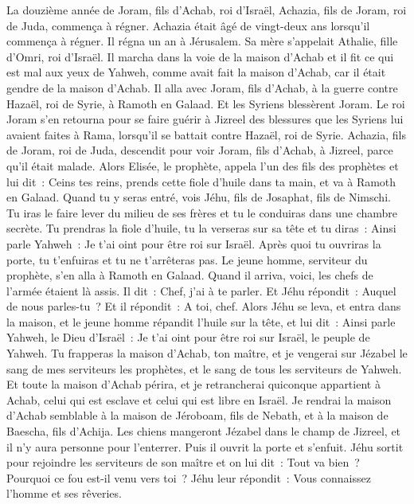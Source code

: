 \begin{multicols}{2}
La douzième année de Joram, fils d'Achab, roi d'Israël, Achazia, fils de Joram, roi de Juda, commença à régner.
Achazia était âgé de vingt-deux ans lorsqu'il commença à régner. Il régna un an à Jérusalem. Sa mère s'appelait Athalie, fille d'Omri, roi d'Israël.
Il marcha dans la voie de la maison d'Achab et il fit ce qui est mal aux yeux de Yahweh, comme avait fait la maison d'Achab, car il était gendre de la maison d'Achab.
Il alla avec Joram, fils d'Achab, à la guerre contre Hazaël, roi de Syrie, à Ramoth en Galaad. Et les Syriens blessèrent Joram.
Le roi Joram s'en retourna pour se faire guérir à Jizreel des blessures que les Syriens lui avaient faites à Rama, lorsqu'il se battait contre Hazaël, roi de Syrie. Achazia, fils de Joram, roi de Juda, descendit pour voir Joram, fils d'Achab, à Jizreel, parce qu'il était malade.
\VerseOne{}Alors Elisée, le prophète, appela l'un des fils des prophètes et lui dit~: Ceins tes reins, prends cette fiole d'huile dans ta main, et va à Ramoth en Galaad.
Quand tu y seras entré, vois Jéhu, fils de Josaphat, fils de Nimschi. Tu iras le faire lever du milieu de ses frères et tu le conduiras dans une chambre secrète.
Tu prendras la fiole d'huile, tu la verseras sur sa tête et tu diras~: Ainsi parle Yahweh~: Je t'ai oint pour être roi sur Israël. Après quoi tu ouvriras la porte, tu t'enfuiras et tu ne t'arrêteras pas.
Le jeune homme, serviteur du prophète, s'en alla à Ramoth en Galaad.
Quand il arriva, voici, les chefs de l'armée étaient là assis. Il dit~: Chef, j'ai à te parler. Et Jéhu répondit~: Auquel de nous parles-tu~? Et il répondit~: A toi, chef.
Alors Jéhu se leva, et entra dans la maison, et le jeune homme répandit l'huile sur la tête, et lui dit~: Ainsi parle Yahweh, le Dieu d'Israël~: Je t'ai oint pour être roi sur Israël, le peuple de Yahweh.
Tu frapperas la maison d'Achab, ton maître, et je vengerai sur Jézabel le sang de mes serviteurs les prophètes, et le sang de tous les serviteurs de Yahweh.
Et toute la maison d'Achab périra, et je retrancherai quiconque appartient à Achab, celui qui est esclave et celui qui est libre en Israël.
Je rendrai la maison d'Achab semblable à la maison de Jéroboam, fils de Nebath, et à la maison de Baescha, fils d'Achija.
Les chiens mangeront Jézabel dans le champ de Jizreel, et il n'y aura personne pour l'enterrer. Puis il ouvrit la porte et s'enfuit.
Jéhu sortit pour rejoindre les serviteurs de son maître et on lui dit~: Tout va bien~? Pourquoi ce fou est-il venu vers toi~? Jéhu leur répondit~: Vous connaissez l'homme et ses rêveries.

\end{multicols}

